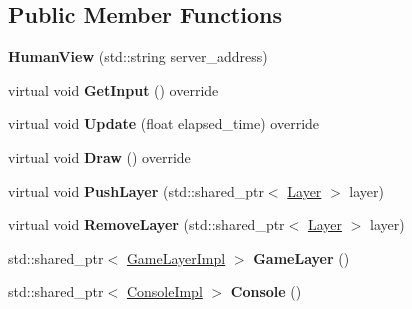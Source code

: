 \subsection*{Public Member Functions}
\begin{DoxyCompactItemize}
\item 
\mbox{\label{classTarbora_1_1HumanView_a189e78e237b55b1a7c534512e8a0fad1}} 
{\bfseries Human\+View} (std\+::string server\+\_\+address)
\item 
\mbox{\label{classTarbora_1_1HumanView_a2b0fc3f27a2503fc261ad4ffa8f1543b}} 
virtual void {\bfseries Get\+Input} () override
\item 
\mbox{\label{classTarbora_1_1HumanView_a06d793557524a02d65a6a6b71bfecb14}} 
virtual void {\bfseries Update} (float elapsed\+\_\+time) override
\item 
\mbox{\label{classTarbora_1_1HumanView_a0b7e7db0f511c36bac18c51a7e897731}} 
virtual void {\bfseries Draw} () override
\item 
\mbox{\label{classTarbora_1_1HumanView_a4e759e449f1d866a693b9397b9c42c42}} 
virtual void {\bfseries Push\+Layer} (std\+::shared\+\_\+ptr$<$ \hyperlink{classTarbora_1_1Layer}{Layer} $>$ layer)
\item 
\mbox{\label{classTarbora_1_1HumanView_a766f8e93c1e7477f87f300e833deb08d}} 
virtual void {\bfseries Remove\+Layer} (std\+::shared\+\_\+ptr$<$ \hyperlink{classTarbora_1_1Layer}{Layer} $>$ layer)
\item 
\mbox{\label{classTarbora_1_1HumanView_ac9ede165602c5746ce70ee9e8be43928}} 
std\+::shared\+\_\+ptr$<$ \hyperlink{classTarbora_1_1GameLayerImpl}{Game\+Layer\+Impl} $>$ {\bfseries Game\+Layer} ()
\item 
\mbox{\label{classTarbora_1_1HumanView_a722bc33ecbabe7bce101f22ae804ea77}} 
std\+::shared\+\_\+ptr$<$ \hyperlink{classTarbora_1_1ConsoleImpl}{Console\+Impl} $>$ {\bfseries Console} ()
\end{DoxyCompactItemize}
